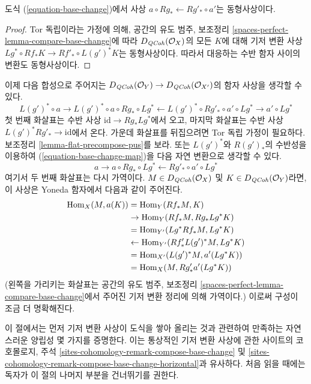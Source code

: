 \begin{lemma}
\label{lemma-flat-precompose-pus}
도식 (\ref{equation-base-change})에서 사상
$a \circ Rg_* \leftarrow Rg'_* \circ a'$는 동형사상이다.
\end{lemma}

\begin{proof}
Tor 독립이라는 가정에 의해, 공간의 유도 범주, 보조정리
\ref{spaces-perfect-lemma-compare-base-change}에 따라
$D_{\mathit{QCoh}}(\mathcal{O}_X)$의 모든 $K$에 대해 기저 변환 사상
$Lg^* \circ Rf_* K \to Rf'_* \circ L(g')^*K$는 동형사상이다.
따라서 대응하는 수반 함자 사이의 변환도 동형사상이다.
\end{proof}

\noindent
이제 다음 합성으로 주어지는
$D_{\mathit{QCoh}}(\mathcal{O}_Y) \to D_{\mathit{QCoh}}(\mathcal{O}_{X'})$의 함자 사상을
생각할 수 있다.
\begin{equation}
\label{equation-base-change-map}
L(g')^* \circ a \to
L(g')^* \circ a \circ Rg_* \circ Lg^* \leftarrow
L(g')^* \circ Rg'_* \circ a' \circ Lg^* \to a' \circ Lg^*
\end{equation}
첫 번째 화살표는 수반 사상 $\text{id} \to Rg_* Lg^*$에서 오고,
마지막 화살표는 수반 사상 $L(g')^*Rg'_* \to \text{id}$에서 온다.
가운데 화살표를 뒤집으려면 Tor 독립 가정이 필요하다. 보조정리
\ref{lemma-flat-precompose-pus}를 보라. 또는
$L(g')^*$와 $R(g')_*$의 수반성을 이용하여
(\ref{equation-base-change-map})을 다음 자연 변환으로 생각할 수 있다.
$$
a \to a \circ Rg_* \circ Lg^* \leftarrow Rg'_* \circ a' \circ Lg^*
$$
여기서 두 번째 화살표는 다시 가역이다. $M \in
D_{\mathit{QCoh}}(\mathcal{O}_X)$ 및 $K \in D_{\mathit{QCoh}}(\mathcal{O}_Y)$라면,
이 사상은 Yoneda 함자에서 다음과 같이 주어진다.
\begin{align*}
\mathop{\mathrm{Hom}}\nolimits_X(M, a(K))
& =
\mathop{\mathrm{Hom}}\nolimits_Y(Rf_*M, K) \\
& \to
\mathop{\mathrm{Hom}}\nolimits_Y(Rf_*M, Rg_* Lg^*K) \\
& =
\mathop{\mathrm{Hom}}\nolimits_{Y'}(Lg^*Rf_*M, Lg^*K) \\
& \leftarrow
\mathop{\mathrm{Hom}}\nolimits_{Y'}(Rf'_* L(g')^*M, Lg^*K) \\
& =
\mathop{\mathrm{Hom}}\nolimits_{X'}(L(g')^*M, a'(Lg^*K)) \\
& =
\mathop{\mathrm{Hom}}\nolimits_X(M, Rg'_*a'(Lg^*K))
\end{align*}
(왼쪽을 가리키는 화살표는 공간의 유도 범주, 보조정리
\ref{spaces-perfect-lemma-compare-base-change}에서 주어진 기저 변환
정리에 의해 가역이다.) 이로써 구성이 조금 더 명확해진다.

\medskip\noindent
이 절에서는 먼저 기저 변환 사상이 도식을 쌓아 올리는 것과 관련하여
만족하는 자연스러운 양립성 몇 가지를 증명한다. 이는 통상적인 기저 변환
사상에 관한 사이트의 코호몰로지, 주석
\ref{sites-cohomology-remark-compose-base-change} 및
\ref{sites-cohomology-remark-compose-base-change-horizontal}과 유사하다.
처음 읽을 때에는 독자가 이 절의 나머지 부분을 건너뛰기를 권한다.

